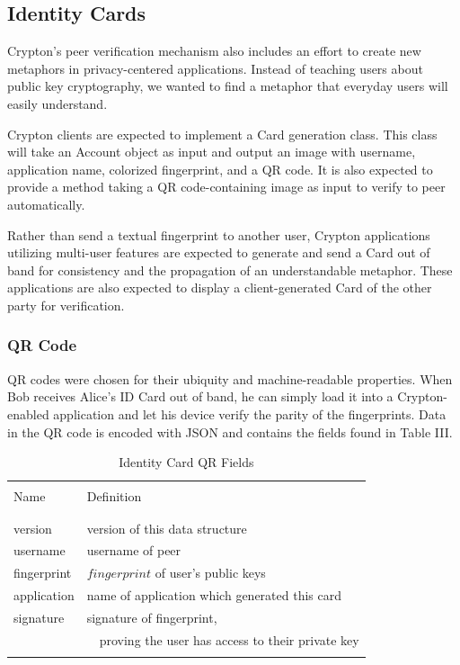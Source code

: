 \documentclass[conference]{IEEEtran}
\begin{document}
\subsection{Identity Cards}
Crypton's peer verification mechanism also includes an effort
to create new metaphors in privacy-centered applications. Instead of teaching
users about public key cryptography, we wanted to find a metaphor that everyday
users will easily understand.

Crypton clients are expected to implement a Card generation class. This class
will take an Account object as input and output an image with username, application
name, colorized fingerprint, and a QR code. It is also expected to provide a method
taking a QR code-containing image as input to verify to peer automatically.

Rather than send a textual fingerprint to another user, Crypton applications
utilizing multi-user features are expected to generate and send a Card out of band
for consistency and the propagation of an understandable metaphor. These applications
are also expected to display a client-generated Card of the other party for verification.

\subsubsection{QR Code}
QR codes were chosen for their ubiquity and machine-readable properties. When
Bob receives Alice's ID Card out of band, he can simply load it into a
Crypton-enabled application and let his device verify the parity of the fingerprints.
Data in the QR code is encoded with JSON and contains the fields found in Table III.

\begin{table}[h]
\caption{Identity Card QR Fields}
\centering
\begin{tabular}{l l}
\hline\hline
\\ [0.1ex]
Name & Definition \\
\\ [0.1ex]
\hline
\\ [0.3ex]
version & version of this data structure \\
username & username of peer \\
fingerprint & \(fingerprint\) of user's public keys  \\
application & name of application which generated this card \\
signature & signature of fingerprint, \\
  & \ \ proving the user has access to their private key \\
\\ [0.3ex]
\hline
\end{tabular}
\label{table:nonlin}
\end{table}
\end{document}
